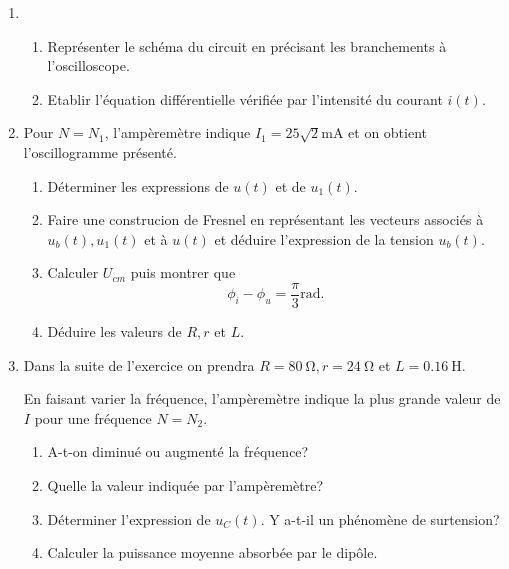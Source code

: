 \documentclass[a4paper]{article}
\begin{document}
\begin{enumerate}
	\item \begin{enumerate}[label=(\alph*)]
		\item Représenter le schéma du circuit en précisant les branchements à l'oscilloscope.
		\item Etablir l'équation différentielle vérifiée par l'intensité du courant $i(t)$.
	\end{enumerate}
\item Pour  $N=N_1$, l'ampèremètre indique $I_1=25\sqrt{2}\si{\milli\A}$ et on obtient l'oscillogramme présenté.
	\begin{enumerate}[label=(\alph*)]
		\item	Déterminer les expressions de $u(t)$ et de $u_1(t)$.
\item Faire une construcion de Fresnel en représentant les vecteurs associés à $u_b(t), u_1(t)$ et à $u(t)$ et déduire l'expression de la tension $u_b(t)$.
\item Calculer  $U_{cm}$ puis montrer que \[
		\phi_i-\phi_u=\frac{\pi}{3}\si{\radian}
.\] 
\item Déduire les valeurs de $R, r$ et $L$.
	\end{enumerate}
\item Dans la suite de l'exercice on prendra $R=\SI{80}{\ohm}, r=\SI{24}{\ohm}$ et $L=\SI{0.16}{\henry}$.

	En faisant varier la fréquence, l'ampèremètre indique la plus grande valeur de $I$ pour une fréquence $N=N_2$.


	\begin{minipage}{0.5\textwidth}
	\begin{enumerate}[label=(\alph*)]
		\item A-t-on diminué ou augmenté la fréquence?
		\item Quelle la valeur indiquée par l'ampèremètre?
		\item Déterminer l'expression de $u_C(t)$. Y a-t-il un phénomène de surtension?
		\item Calculer la puissance moyenne absorbée par le dipôle.
	\end{enumerate}
\end{minipage}%
\begin{minipage}{0.5\textwidth}
	\centering
{}
\end{minipage}
\end{enumerate}
\newpage
\end{document}
